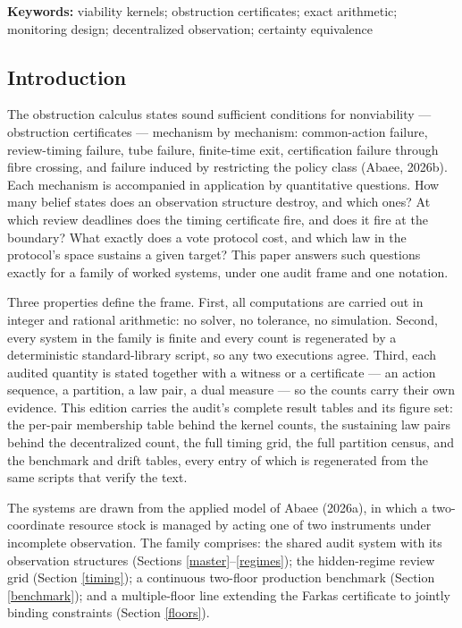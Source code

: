 \documentclass[10pt,twocolumn]{article}
\theoremstyle{definition}
\begin{document}
\textbf{Keywords:} viability kernels; obstruction certificates; exact
arithmetic; monitoring design; decentralized observation; certainty
equivalence

\subsection{Introduction}\label{introduction}

The obstruction calculus states sound sufficient conditions for
nonviability --- obstruction certificates --- mechanism by mechanism:
common-action failure, review-timing failure, tube failure, finite-time
exit, certification failure through fibre crossing, and failure induced
by restricting the policy class (Abaee, 2026b). Each mechanism is
accompanied in application by quantitative questions. How many belief
states does an observation structure destroy, and which ones? At which
review deadlines does the timing certificate fire, and does it fire at
the boundary? What exactly does a vote protocol cost, and which law in
the protocol's space sustains a given target? This paper answers such
questions exactly for a family of worked systems, under one audit frame
and one notation.

Three properties define the frame. First, all computations are carried
out in integer and rational arithmetic: no solver, no tolerance, no
simulation. Second, every system in the family is finite and every count
is regenerated by a deterministic standard-library script, so any two
executions agree. Third, each audited quantity is stated together with a
witness or a certificate --- an action sequence, a partition, a law
pair, a dual measure --- so the counts carry their own evidence. This
edition carries the audit's complete result tables and its figure set:
the per-pair membership table behind the kernel counts, the sustaining
law pairs behind the decentralized count, the full timing grid, the full
partition census, and the benchmark and drift tables, every entry of
which is regenerated from the same scripts that verify the text.

The systems are drawn from the applied model of Abaee (2026a), in which
a two-coordinate resource stock is managed by acting one of two
instruments under incomplete observation. The family comprises: the
shared audit system with its observation structures (Sections
\ref{master}--\ref{regimes}); the hidden-regime review grid (Section
\ref{timing}); a continuous two-floor production benchmark (Section
\ref{benchmark}); and a multiple-floor line extending the Farkas
certificate to jointly binding constraints (Section \ref{floors}).
\end{document}
